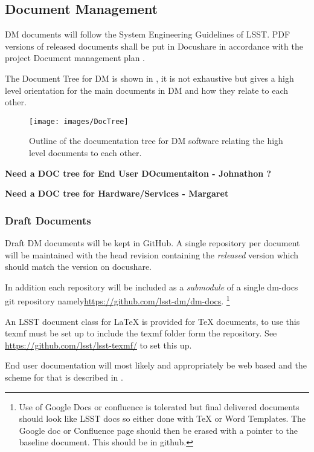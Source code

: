 \subsection {Document Management} \label{sect:docman}
DM documents will follow the System Engineering Guidelines of LSST. PDF versions of released documents shall be put in Docushare in accordance with the project Document management plan .

The Document Tree for DM is shown in , it is not exhaustive but gives a high level orientation for the main documents in DM and how they relate to each other.

\begin{figure}
\begin{center}
 \texttt{[image: images/DocTree]}
\caption{Outline of the documentation tree for DM software relating the high level documents to each other. \label{fig:doctree}}
\end{center}
\end{figure}


\bf{ Need a DOC tree for End User DOcumentaiton - Johnathon ?}

\bf{ Need a DOC tree for Hardware/Services  - Margaret }

\subsubsection{Draft Documents}
Draft DM documents will be kept in GitHub. A single repository per document will be maintained with the head revision containing the {\em released } version which should match the version on docushare. 

In addition each repository will be included as a {\em submodule} of a single dm-docs git repository namely\url{https://github.com/lsst-dm/dm-docs}. 
\footnote{Use of Google Docs or confluence is tolerated but final delivered documents should look like LSST docs so either done with TeX or Word Templates. The Google doc or Confluence page should then be erased with a pointer to the baseline document. This should be in github.}

An LSST document class for LaTeX is provided for TeX documents, to use this texmf must be set up to include the texmf folder form the repository. See \url{https://github.com/lsst/lsst-texmf/} to set this up. 

End user documentation will most likely and appropriately be web based and the scheme for that is described in \citeyearpar{LDM-493}.



